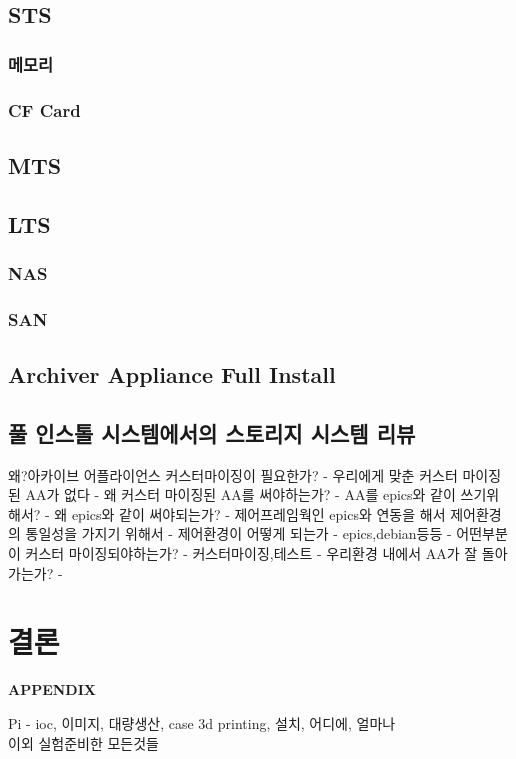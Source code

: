\documentclass[11pt
  , a4paper
  , article
  , oneside
]{memoir}
\begin{document}
\section{STS}
\subsection{메모리}
\subsection{CF Card}
\section{MTS}
\section{LTS}
\subsection{NAS}
\subsection{SAN}
\section{Archiver Appliance Full Install}
\section{풀 인스톨 시스템에서의 스토리지 시스템 리뷰}
왜?아카이브 어플라이언스 커스터마이징이 필요한가? - 우리에게 맞춘 커스터 마이징된 AA가 없다 - 왜 커스터 마이징된 AA를 써야하는가? - AA를 epics와 같이 쓰기위해서? - 왜 epics와 같이 써야되는가? - 제어프레임웍인 epics와 연동을 해서 제어환경의 통일성을 가지기 위해서 - 제어환경이 어떻게 되는가 - epics,debian등등 - 어떤부분이 커스터 마이징되야하는가? - 커스터마이징,테스트 - 우리환경 내에서 AA가 잘 돌아가는가? - \\

\chapter{결론}
\clearpage

\begin{center}
	\label{appx:a}\LARGE\textbf{APPENDIX}
\end{center}

Pi - ioc, 이미지, 대량생산, case 3d printing, 설치, 어디에, 얼마나\\
이외 실험준비한 모든것들
\end{document}
